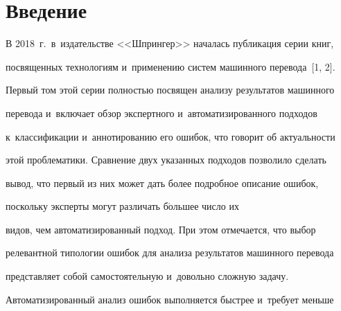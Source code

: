 

  












 \thispagestyle{headings}


 


 \vspace*{-12pt} 





\section{Введение}





  В 2018~г.\ в~издательстве <<Шпрингер>> началась публикация серии книг, 


посвященных технологиям и~применению систем машинного перевода~[1, 2]. 


Первый том этой серии полностью посвящен анализу результатов машинного 


перевода и~включает обзор экспертного и~автоматизированного подходов 


к~классификации и~аннотированию его ошибок, что говорит об актуальности 


этой проблематики. Сравнение двух указанных подходов позволило сделать 


вывод, что первый из них может дать более подробное описание ошибок, 


поскольку эксперты могут различать б$\acute{\mbox{о}}$льшее число их 


видов, чем автоматизированный подход. При этом отмечается, что выбор 


релевантной типологии ошибок для анализа результатов машинного перевода 


представляет собой самостоятельную и~довольно сложную задачу. 


Автоматизированный анализ ошибок выполняется быстрее и~требует меньше 


